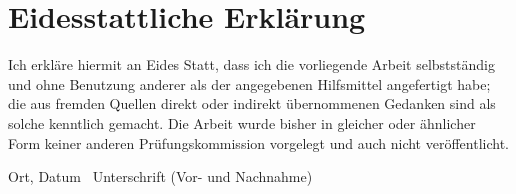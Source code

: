 \chapter{Eidesstattliche Erklärung}
Ich erkläre hiermit an Eides Statt, dass ich die vorliegende Arbeit selbstständig 
und ohne Benutzung anderer als der angegebenen Hilfsmittel angefertigt 
habe; die aus fremden Quellen direkt oder indirekt übernommenen Gedanken 
sind als solche kenntlich gemacht. 
Die Arbeit wurde bisher in gleicher oder ähnlicher Form keiner anderen Prüfungskommission vorgelegt
und auch nicht veröffentlicht.

\begin{flushright}
Ort, Datum  \ Unterschrift (Vor- und Nachnahme)
\end{flushright}

